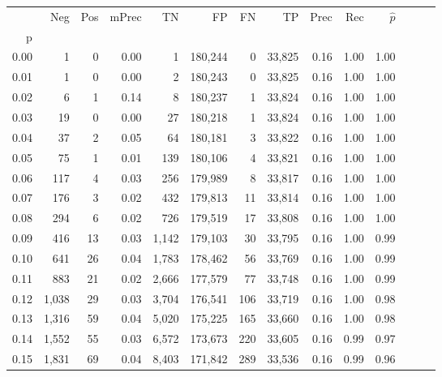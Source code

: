 \begin{tabular}{rrrrrrrrrrrrrr}
\toprule
{} &    Neg &  Pos & mPrec &       TN &       FP &      FN &      TP &  Prec &   Rec & $\hat{p}$ \\
p    &        &      &       &          &          &         &         &       &       &           \\
\midrule
0.00 &      1 &    0 &  0.00 &        1 &  180,244 &       0 &  33,825 &  0.16 &  1.00 &      1.00 \\
0.01 &      1 &    0 &  0.00 &        2 &  180,243 &       0 &  33,825 &  0.16 &  1.00 &      1.00 \\
0.02 &      6 &    1 &  0.14 &        8 &  180,237 &       1 &  33,824 &  0.16 &  1.00 &      1.00 \\
0.03 &     19 &    0 &  0.00 &       27 &  180,218 &       1 &  33,824 &  0.16 &  1.00 &      1.00 \\
0.04 &     37 &    2 &  0.05 &       64 &  180,181 &       3 &  33,822 &  0.16 &  1.00 &      1.00 \\
0.05 &     75 &    1 &  0.01 &      139 &  180,106 &       4 &  33,821 &  0.16 &  1.00 &      1.00 \\
0.06 &    117 &    4 &  0.03 &      256 &  179,989 &       8 &  33,817 &  0.16 &  1.00 &      1.00 \\
0.07 &    176 &    3 &  0.02 &      432 &  179,813 &      11 &  33,814 &  0.16 &  1.00 &      1.00 \\
0.08 &    294 &    6 &  0.02 &      726 &  179,519 &      17 &  33,808 &  0.16 &  1.00 &      1.00 \\
0.09 &    416 &   13 &  0.03 &    1,142 &  179,103 &      30 &  33,795 &  0.16 &  1.00 &      0.99 \\
0.10 &    641 &   26 &  0.04 &    1,783 &  178,462 &      56 &  33,769 &  0.16 &  1.00 &      0.99 \\
0.11 &    883 &   21 &  0.02 &    2,666 &  177,579 &      77 &  33,748 &  0.16 &  1.00 &      0.99 \\
0.12 &  1,038 &   29 &  0.03 &    3,704 &  176,541 &     106 &  33,719 &  0.16 &  1.00 &      0.98 \\
0.13 &  1,316 &   59 &  0.04 &    5,020 &  175,225 &     165 &  33,660 &  0.16 &  1.00 &      0.98 \\
0.14 &  1,552 &   55 &  0.03 &    6,572 &  173,673 &     220 &  33,605 &  0.16 &  0.99 &      0.97 \\
0.15 &  1,831 &   69 &  0.04 &    8,403 &  171,842 &     289 &  33,536 &  0.16 &  0.99 &      0.96 \\

\end{tabular}
